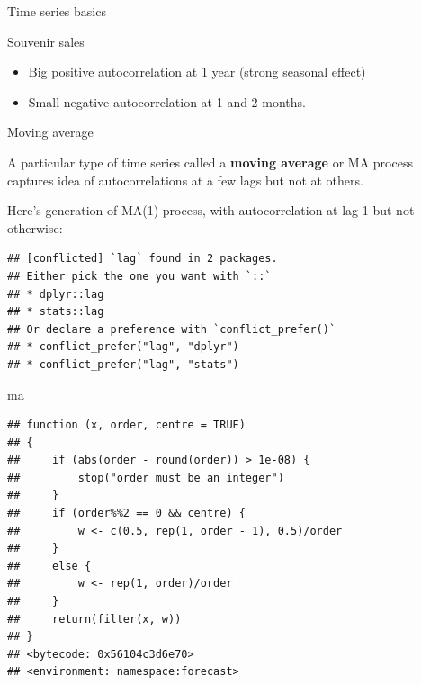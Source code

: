 \documentclass[ignorenonframetext,]{beamer}
\newenvironment{Shaded}{\begin{snugshade}}{\end{snugshade}}
\newcommand{\DataTypeTok}[1]{\textcolor[rgb]{0.13,0.29,0.53}{#1}}
\newcommand{\DecValTok}[1]{\textcolor[rgb]{0.00,0.00,0.81}{#1}}
\newcommand{\KeywordTok}[1]{\textcolor[rgb]{0.13,0.29,0.53}{\textbf{#1}}}
\newcommand{\NormalTok}[1]{#1}
\newcommand{\OperatorTok}[1]{\textcolor[rgb]{0.81,0.36,0.00}{\textbf{#1}}}
\newcommand{\StringTok}[1]{\textcolor[rgb]{0.31,0.60,0.02}{#1}}
\providecommand{\tightlist}{%
  \setlength{\itemsep}{0pt}\setlength{\parskip}{0pt}}
\begin{document}
\begin{frame}[fragile]{Time series basics}
\begin{block}{Souvenir sales}
\begin{itemize}
\tightlist
\item
  Big positive autocorrelation at 1 year (strong seasonal effect)
\item
  Small negative autocorrelation at 1 and 2 months.
\end{itemize}

\end{block}

\begin{block}{Moving average}

A particular type of time series called a \textbf{moving average} or MA
process captures idea of autocorrelations at a few lags but not at
others.

Here's generation of MA(1) process, with autocorrelation at lag 1 but
not otherwise:

\begin{Shaded}
\end{Shaded}

\begin{verbatim}
## [conflicted] `lag` found in 2 packages.
## Either pick the one you want with `::` 
## * dplyr::lag
## * stats::lag
## Or declare a preference with `conflict_prefer()`
## * conflict_prefer("lag", "dplyr")
## * conflict_prefer("lag", "stats")
\end{verbatim}

\begin{Shaded}
\begin{Highlighting}[]
\NormalTok{ma}
\end{Highlighting}
\end{Shaded}

\begin{verbatim}
## function (x, order, centre = TRUE) 
## {
##     if (abs(order - round(order)) > 1e-08) {
##         stop("order must be an integer")
##     }
##     if (order%%2 == 0 && centre) {
##         w <- c(0.5, rep(1, order - 1), 0.5)/order
##     }
##     else {
##         w <- rep(1, order)/order
##     }
##     return(filter(x, w))
## }
## <bytecode: 0x56104c3d6e70>
## <environment: namespace:forecast>
\end{verbatim}


\end{block}
\end{frame}
\end{document}
